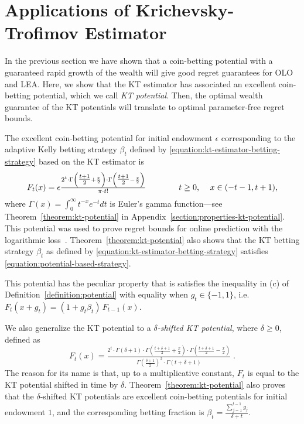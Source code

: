 \section{Applications of Krichevsky-Trofimov Estimator}
\label{section:kt-estimator}

In the previous section we have shown that a coin-betting potential with a
guaranteed rapid growth of the wealth will give good regret guarantees for
\ac{OLO} and \ac{LEA}. Here, we show that the KT estimator has associated an
excellent coin-betting potential, which we call \emph{KT potential}.  Then, the
optimal wealth guarantee of the KT potentials will translate to optimal
parameter-free regret bounds.

The excellent coin-betting potential for initial endowment $\epsilon$
corresponding to the adaptive Kelly betting strategy
$\beta_t$ defined by \eqref{equation:kt-estimator-betting-strategy}
based on the KT estimator is
\begin{equation}
\label{equation:kt-estimator-potential}
F_t(x) = \epsilon \tfrac{2^t \cdot \Gamma \left( \tfrac{t+1}{2} + \frac{x}{2} \right) \cdot \Gamma \left( \tfrac{t+1}{2} - \frac{x}{2} \right)}{\pi \cdot t!}
\qquad \qquad \text{$t \ge 0$, \quad $x \in \left(-t-1, t+1\right)$,}
\end{equation}
where $\Gamma(x) = \int_0^\infty t^{-x} e^{-t} dt$ is Euler's gamma
function---see Theorem~\ref{theorem:kt-potential} in
Appendix~\ref{section:properties-kt-potential}.  This potential was used to
prove regret bounds for online prediction with the logarithmic
loss~\cite{Krichevsky-Trofimov-1981}\cite[Section
9.7]{Cesa-Bianchi-Lugosi-2006}.  Theorem~\ref{theorem:kt-potential} also shows
that the KT betting strategy $\beta_t$ as defined by
\eqref{equation:kt-estimator-betting-strategy} satisfies
\eqref{equation:potential-based-strategy}.

This potential has the peculiar property that is satisfies the inequality in
(c) of Definition~\ref{definition:potential} with equality when $g_t\in
\{-1,1\}$, i.e. $F_t(x+g_t)=(1+g_t \beta_t) \, F_{t-1}(x)$.

We also generalize the KT potential to a \emph{$\delta$-shifted KT
potential}, where $\delta\geq0$, defined as
\[
F_t(x) = \tfrac{2^t \cdot \Gamma\left(\delta + 1 \right) \cdot \Gamma\left(\tfrac{t+\delta+1}{2} + \frac{x}{2} \right) \cdot \Gamma\left(\tfrac{t+\delta+1}{2} - \frac{x}{2} \right)}{\Gamma\left(\tfrac{\delta+1}{2} \right)^2 \cdot \Gamma \left(t+\delta+1\right)} \; .
\]
The reason for its name is that, up to a multiplicative constant, $F_t$ is
equal to the KT potential shifted in time by $\delta$.
Theorem~\ref{theorem:kt-potential} also proves that the $\delta$-shifted KT
potentials are excellent coin-betting potentials for initial endowment $1$, and
the corresponding betting fraction is $\beta_t = \tfrac{\sum_{j=1}^{t-1}
g_j}{\delta+t}$.

